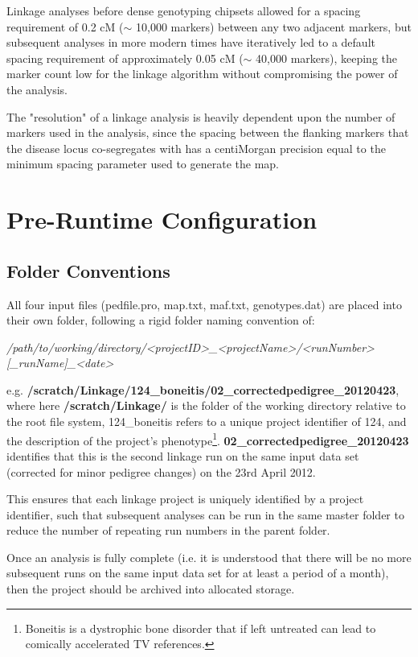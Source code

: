 Linkage analyses before dense genotyping chipsets allowed for a spacing requirement of 0.2 cM ($\sim$ 10,000 markers) between any two adjacent markers, but subsequent analyses in more modern times have iteratively led to a default spacing requirement of approximately 0.05 cM ($\sim$ 40,000 markers), keeping the marker count low for the linkage algorithm without compromising the power of the analysis.

The "resolution" of a linkage analysis is heavily dependent upon the number of markers used in the analysis, since the spacing between the flanking markers that the disease locus co-segregates with has a centiMorgan precision equal to the minimum spacing parameter used to generate the map.


\section{Pre-Runtime Configuration}

\subsection{Folder Conventions}\label{ref:meth:foldconv}

All four input files (pedfile.pro, map.txt, maf.txt, genotypes.dat) are placed into their own folder, following a rigid folder naming convention of:

\textit{\footnotesize /path/to/working/directory/<projectID>\_<projectName>/<runNumber>[\_runName]\_<date>}

e.g. {\bf\footnotesize /scratch/Linkage/124\_boneitis/02\_correctedpedigree\_20120423}, where here {\bf\footnotesize /scratch/Linkage/} is the folder of the working directory relative to the root file system, 124\_boneitis refers to a unique project identifier of 124, and the description of the project's phenotype\footnote{Boneitis is a dystrophic bone disorder that if left untreated can lead to comically accelerated TV references.}. {{\bf\footnotesize 02\_correctedpedigree\_20120423} identifies that this is the second linkage run on the same input data set (corrected for minor pedigree changes) on the 23rd April 2012.}

This ensures that each linkage project is uniquely identified by a project identifier, such that subsequent analyses can be run in the same master folder to reduce the number of repeating run numbers in the parent folder.

Once an analysis is fully complete (i.e. it is understood that there will be no more subsequent runs on the same input data set for at least a period of a month), then the project should be archived into allocated storage.


